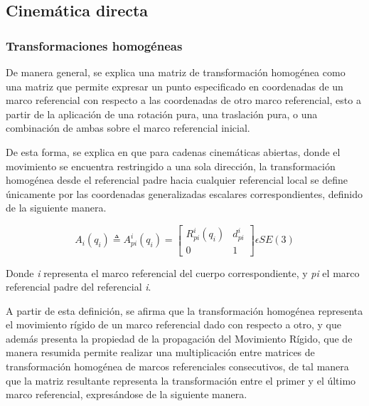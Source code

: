 \subsection{Cinemática directa}
    \subsubsection{Transformaciones homogéneas}
        De manera general, se explica una matriz de transformación homogénea como una
        matriz que permite expresar un punto especificado en coordenadas de
        un marco referencial con respecto a las coordenadas de otro marco 
        referencial, esto a partir de la aplicación de una rotación pura, 
        una traslación pura, o una combinación de ambas sobre el marco referencial
        inicial.

        De esta forma, se explica en \cite{3DMotion} que para cadenas cinemáticas abiertas, 
        donde el movimiento se encuentra restringido a una sola dirección, la 
        transformación homogénea desde el referencial padre hacia cualquier referencial 
        local se define únicamente por las coordenadas generalizadas escalares 
        correspondientes, definido de la siguiente manera.

        \begin{equation*} 
            A_i(q_i) \triangleq A^i_{pi}(q_i) =
            \begin{bmatrix}
                R^i_{pi}(q_i) & d^i_{pi}\\
                0 & 1
            \end{bmatrix}
            \epsilon SE(3)
        \end{equation*}

        Donde \emph{i} representa el marco referencial del cuerpo
        correspondiente, y \emph{pi} el marco referencial padre del 
        referencial \emph{i}.

        A partir de esta definición, se afirma que la transformación homogénea representa
        el movimiento rígido de un marco referencial dado con respecto a otro, y que además 
        presenta la propiedad de la propagación del Movimiento Rígido, que de manera resumida 
        permite realizar una multiplicación entre matrices de transformación homogénea de 
        marcos referenciales consecutivos, de tal manera que la matriz resultante representa 
        la transformación entre el primer y el último marco referencial, expresándose de la 
        siguiente manera.

